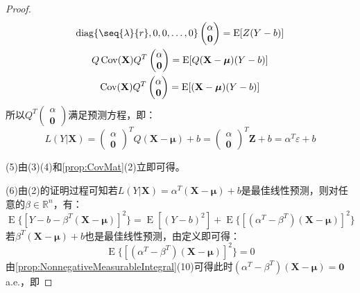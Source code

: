 \begin{proof}
\begin{gather*}
		\operatorname{diag}\{\seq{\lambda}{r},0,0,\dots,0\}
		\begin{pmatrix}
			\alpha \\
			\mathbf{0}	
		\end{pmatrix}=\operatorname{E}[Z(Y-b)] \\
		Q\operatorname{Cov}(\mathbf{X})Q^T
		\begin{pmatrix}
			\alpha \\
			\mathbf{0}	
		\end{pmatrix}=\operatorname{E}[Q(\mathbf{X}-\boldsymbol{\mu})(Y-b)] \\
		\operatorname{Cov}(\mathbf{X})Q^T
		\begin{pmatrix}
			\alpha \\
			\mathbf{0}	
		\end{pmatrix}=\operatorname{E}[(\mathbf{X}-\boldsymbol{\mu})(Y-b)] 
	\end{gather*}
	所以$Q^T
	\begin{pmatrix}
		\alpha \\
		\mathbf{0}
	\end{pmatrix}$满足预测方程，即：
	\begin{equation*}
		L(Y|\mathbf{X})=
		\begin{pmatrix}
			\alpha \\
			\mathbf{0}
		\end{pmatrix}^TQ(\mathbf{X}-\boldsymbol{\mu})+b=
		\begin{pmatrix}
		\alpha \\
		\mathbf{0}
		\end{pmatrix}^T\mathbf{Z}+b=\alpha^T\varepsilon+b
	\end{equation*}\par
	(5)由(3)(4)和\cref{prop:CovMat}(2)立即可得。\par
	(6)由(2)的证明过程可知若$L(Y|\mathbf{X})=\alpha^T(\mathbf{X}-\boldsymbol{\mu})+b$是最佳线性预测，则对任意的$\beta\in\mathbb{R}^{n}$，有：
	\begin{equation*}
		\operatorname{E}\{[Y-b-\beta^T(\mathbf{X}-\boldsymbol{\mu})]^2\}=\operatorname{E}[(Y-b)^2]+\operatorname{E}\{[(\alpha^T-\beta^T)(\mathbf{X}-\boldsymbol{\mu})]^2\}
	\end{equation*}
	若$\beta^T(\mathbf{X}-\boldsymbol{\mu})+b$也是最佳线性预测，由定义即可得：
	\begin{equation*}
		\operatorname{E}\{[(\alpha^T-\beta^T)(\mathbf{X}-\boldsymbol{\mu})]^2\}=0
	\end{equation*}
	由\cref{prop:NonnegativeMeasurableIntegral}(10)可得此时$(\alpha^T-\beta^T)(\mathbf{X}-\boldsymbol{\mu})=\mathbf{0}\;$a.e.，即

\end{proof}
